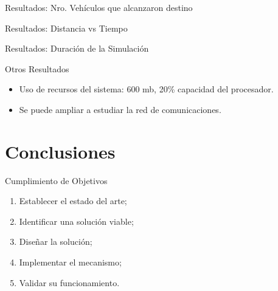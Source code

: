 \documentclass[aspectratio=169]{beamer}
\begin{document}
\begin{frame}[standout]
\centering
{}
\end{frame}

\begin{frame}{Resultados: Nro. Vehículos que alcanzaron destino}
\begin{figure}
    \centering
    \renewcommand{\figurewidth}{\linewidth}
    \renewcommand{\figureheight}{200}
    
\end{figure}
\end{frame}

\begin{frame}{Resultados: Distancia vs Tiempo}
\begin{figure}
    \centering
    \renewcommand{\figurewidth}{\linewidth}
    \renewcommand{\figureheight}{165}
    
\end{figure}
\end{frame}

\begin{frame}{Resultados: Duración de la Simulación}
\begin{figure}
    \centering
    \renewcommand{\figurewidth}{\linewidth}
    \renewcommand{\figureheight}{165}
    
\end{figure}
\end{frame}

\begin{frame}{Otros Resultados}
\begin{itemize}
    \item Uso de recursos del sistema: 600 mb, 20\% capacidad del procesador.
    \item Se puede ampliar a estudiar la red de comunicaciones.
\end{itemize}
\end{frame}

\section{Conclusiones}
\begin{frame}{Cumplimiento de Objetivos}
\centering
\begin{minipage}{.8\textwidth}
    \begin{enumerate}\pause
        \item Establecer el estado del arte;\hfill\checkmark\pause
        \item Identificar una solución viable;\hfill\checkmark\pause
        \item Diseñar la solución;\hfill\checkmark\pause
        \item Implementar el mecanismo;\hfill\checkmark\pause
        \item Validar su funcionamiento.\hfill\checkmark
    \end{enumerate}%
\end{minipage}
\end{frame}
\end{document}
